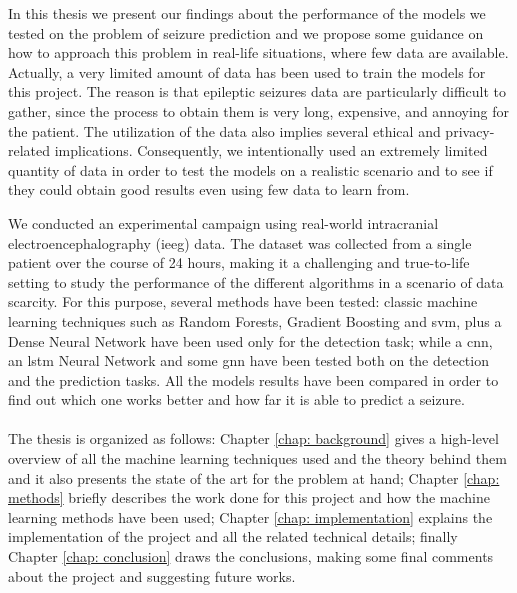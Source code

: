 In this thesis we present our findings about the performance of the models we tested on the problem of seizure prediction and we propose some guidance on how to approach this problem in real-life situations, where few data are available. Actually, a very limited amount of data has been used to train the models for this project. The reason is that epileptic seizures data are particularly difficult to gather, since the process to obtain them is very long, expensive, and annoying for the patient. The utilization of the data also implies several ethical and privacy-related implications. Consequently, we intentionally used an extremely limited quantity of data in order to test the models on a realistic scenario and to see if they could obtain good results even using few data to learn from.

We conducted an experimental campaign using real-world intracranial electroencephalography (\acs{ieeg}) data. The dataset was collected from a single patient over the course of 24 hours, making it a challenging and true-to-life setting to study the performance of the different algorithms in a scenario of data scarcity. For this purpose, several methods have been tested: classic machine learning techniques such as Random Forests, Gradient Boosting and \acf{svm}, plus a Dense Neural Network have been used only for the detection task; while a \acf{cnn}, an \acs{lstm} Neural Network and some \acf{gnn} have been tested both on the detection and the prediction tasks. All the models results have been compared in order to find out which one works better and how far it is able to predict a seizure.

\paragraph{} The thesis is organized as follows: Chapter \ref{chap: background} gives a high-level overview of all the machine learning techniques used and the theory behind them and it also presents the state of the art for the problem at hand; Chapter \ref{chap: methods} briefly describes the work done for this project and how the machine learning methods have been used; Chapter \ref{chap: implementation} explains the implementation of the project and all the related technical details; finally Chapter \ref{chap: conclusion} draws the conclusions, making some final comments about the project and suggesting future works.

